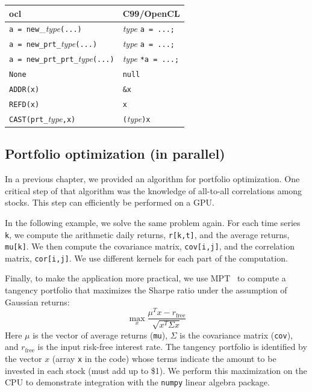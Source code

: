 \documentclass[justified,sixbynine]{tufte-book}
\def\ft{\small\tt}
\theoremstyle{plain}%
\theoremstyle{definition}
\theoremstyle{remark}
\begin{document}
\begin{fullwidth}
\begin{center}
\begin{tabular}{|l|l|} \hline
{\bf ocl} & {\bf C99/OpenCL} \\ \hline
{\ft a = new}\_{\it type}{\ft (...)} & {\it type} {\ft  a = ...;} \\
{\ft a = new\_prt\_}{\it type}{\ft (...)} & {\it type} {\ft *a = ...;} \\
{\ft a = new\_prt\_prt\_}{\it type}{\ft (...)} & {\it type} {\ft **a = ...;} \\
{\ft None} & {\ft null} \\
{\ft ADDR(x)} & {\ft \&x} \\
{\ft REFD(x)} & {\ft *x} \\
{\ft CAST(prt\_}{\it type}{\ft ,x)} & {\ft (}{\it type}{\ft *)x} \\ \hline
\end{tabular}
\end{center}

\subsection{Portfolio optimization (in parallel)}

In a previous chapter, we provided an algorithm for portfolio optimization. One critical step of that algorithm was the knowledge of all-to-all correlations among stocks. This step can efficiently be performed on a GPU.

In the following example, we solve the same problem again. For each time series {\ft k}, we compute the arithmetic daily returns, {\ft r[k,t]}, and the average returns, {\ft mu[k]}. We then compute the covariance matrix, {\ft cov[i,j]}, and the correlation matrix, {\ft cor[i,j]}. We use different kernels for each part of the computation.

Finally, to make the application more practical, we use MPT~\cite{mpt} to compute a tangency portfolio that maximizes the Sharpe ratio under the assumption of Gaussian returns:
\begin{equation}
\max_{x} \frac{\mu^T x - r_{\textrm{free}}}{\sqrt{x^T \Sigma x}}
\end{equation}
Here $\mu$ is the vector of average returns ({\ft mu}), $\Sigma$ is the covariance matrix  ({\ft cov}), and $r_{\textrm{free}}$ is the input risk-free interest rate. The tangency portfolio is identified by the vector $x$ (array {\ft x} in the code) whose terms indicate the amount to be invested in each stock (must add up to \$1). We perform this maximization on the CPU to demonstrate integration with the {\ft numpy} linear algebra package.


\end{fullwidth}
\end{document}
